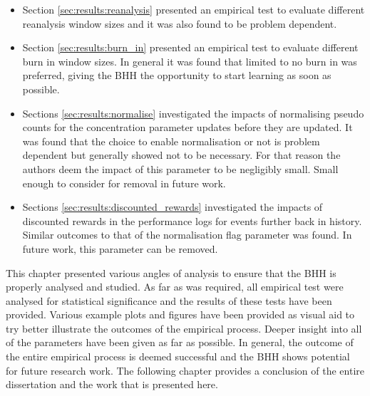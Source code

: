 \begin{itemize}
    \item Section \ref{sec:results:reanalysis} presented an empirical test to evaluate different reanalysis window sizes and it was also found to be problem dependent.
    
    \item Section \ref{sec:results:burn_in} presented an empirical test to evaluate different burn in window sizes. In general it was found that limited to no burn in was preferred, giving the \Ac{BHH} the opportunity to start learning as soon as possible.
    
    \item Sections \ref{sec:results:normalise} investigated the impacts of normalising pseudo counts for the concentration parameter updates before they are updated. It was found that the choice to enable normalisation or not is problem dependent but generally showed not to be necessary. For that reason the authors deem the impact of this parameter to be negligibly small. Small enough to consider for removal in future work. 
    
    \item Sections \ref{sec:results:discounted_rewards} investigated the impacts of discounted rewards in the performance logs for events further back in history. Similar outcomes to that of the normalisation flag parameter was found. In future work, this parameter can be removed.
\end{itemize}

This chapter presented various angles of analysis to ensure that the \Ac{BHH} is properly analysed and studied. As far as was required, all empirical test were analysed for statistical significance and the results of these tests have been provided. Various example plots and figures have been provided as visual aid to try better illustrate the outcomes of the empirical process. Deeper insight into all of the parameters have been given as far as possible. In general, the outcome of the entire empirical process is deemed successful and the \Ac{BHH} shows potential for future research work. The following chapter provides a conclusion of the entire dissertation and the work that is presented here. 